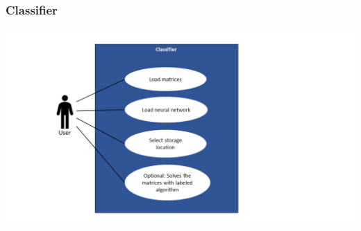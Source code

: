 \documentclass[parskip=full]{scrartcl}
\begin{document}
\subsubsection{Classifier}
\includegraphics[width=1.3\textwidth]{useCase_Classifier}
\end{document}
